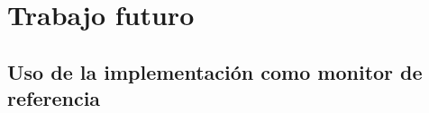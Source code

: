 \chapter{Trabajo futuro}
\section{Uso de la implementación como monitor de referencia}
\label{section:future-work:reference-monitor}
